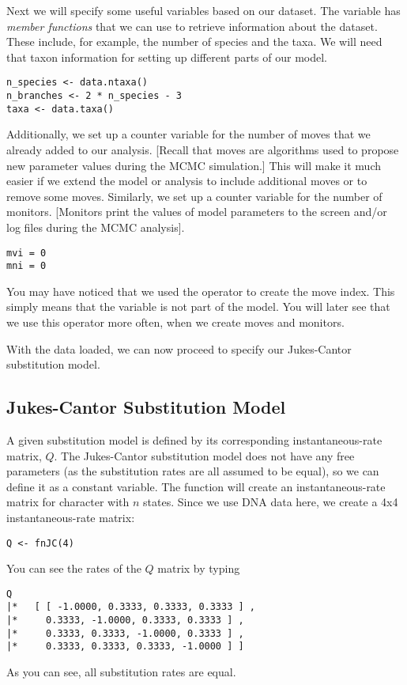 Next we will specify some useful variables based on our dataset. The variable  has \emph{member functions} that we can use to retrieve information about the dataset. 
These include, for example, the number of species and the taxa.
We will need that taxon information for setting up different parts of our model.
{\tt \begin{snugshade*}
\begin{lstlisting}
n_species <- data.ntaxa()
n_branches <- 2 * n_species - 3
taxa <- data.taxa()
\end{lstlisting}
\end{snugshade*}}

Additionally, we set up a counter variable for the number of moves that we already added to our analysis.
[Recall that moves are algorithms used to propose new parameter values during the MCMC simulation.]
This will make it much easier if we extend the model or analysis to include additional moves or to remove some moves.
Similarly, we set up a counter variable for the number of monitors. 
[Monitors print the values of model parameters to the screen and/or log files during the MCMC analysis].
{\tt \begin{snugshade*}
\begin{lstlisting}
mvi = 0 
mni = 0
\end{lstlisting}
\end{snugshade*}}
You may have noticed that we used the \cl{=} operator to create the move index.
This simply means that the variable is not part of the model.
You will later see that we use this operator more often, \EG when we create moves and monitors.

With the data loaded, we can now proceed to specify our Jukes-Cantor substitution model.

\subsection{Jukes-Cantor Substitution Model}

A given substitution model is defined by its corresponding instantaneous-rate matrix, $Q$.
The Jukes-Cantor substitution model does not have any free parameters (as the substitution rates are all assumed to be equal), so we can define it as a constant variable.
The function  will create an instantaneous-rate matrix for character with $n$ states.
Since we use DNA data here, we create a 4x4 instantaneous-rate matrix:
{\tt \begin{snugshade*}
\begin{lstlisting}
Q <- fnJC(4) 
\end{lstlisting}
\end{snugshade*}}
You can see the rates of the $Q$ matrix by typing
{\tt \begin{snugshade*}
\begin{lstlisting}
Q
|*   [ [ -1.0000, 0.3333, 0.3333, 0.3333 ] ,
|*     0.3333, -1.0000, 0.3333, 0.3333 ] ,
|*     0.3333, 0.3333, -1.0000, 0.3333 ] ,
|*     0.3333, 0.3333, 0.3333, -1.0000 ] ]
\end{lstlisting}
\end{snugshade*}}
As you can see, all substitution rates are equal.



